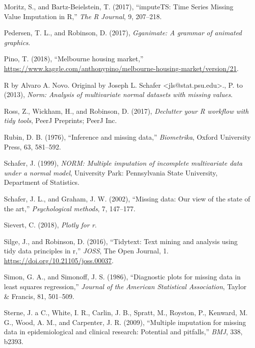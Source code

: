 \documentclass[]{article}
\theoremstyle{definition}
\theoremstyle{definition}
\theoremstyle{definition}
\theoremstyle{remark}
\begin{document}
\leavevmode\hypertarget{ref-imputeTS}{}%
Moritz, S., and Bartz-Beielstein, T. (2017), ``imputeTS: Time Series
Missing Value Imputation in R,'' \emph{The R Journal}, 9, 207--218.

\leavevmode\hypertarget{ref-gganimate}{}%
Pedersen, T. L., and Robinson, D. (2017), \emph{Gganimate: A grammar of
animated graphics}.

\leavevmode\hypertarget{ref-kaggle2018}{}%
Pino, T. (2018), ``Melbourne housing market,''
\url{https://www.kaggle.com/anthonypino/melbourne-housing-market/version/21}.

\leavevmode\hypertarget{ref-norm}{}%
R by Alvaro A. Novo. Original by Joseph L. Schafer
\textless{}jls@stat.psu.edu\textgreater{}., P. to (2013), \emph{Norm:
Analysis of multivariate normal datasets with missing values}.

\leavevmode\hypertarget{ref-Ross2017}{}%
Ross, Z., Wickham, H., and Robinson, D. (2017), \emph{Declutter your R
workflow with tidy tools}, PeerJ Preprints; PeerJ Inc.

\leavevmode\hypertarget{ref-Rubin1976}{}%
Rubin, D. B. (1976), ``Inference and missing data,'' \emph{Biometrika},
Oxford University Press, 63, 581--592.

\leavevmode\hypertarget{ref-schafer-norm}{}%
Schafer, J. (1999), \emph{NORM: Multiple imputation of incomplete
multivariate data under a normal model}, University Park: Pennsylvania
State University, Department of Statistics.

\leavevmode\hypertarget{ref-Schafer2002}{}%
Schafer, J. L., and Graham, J. W. (2002), ``Missing data: Our view of
the state of the art,'' \emph{Psychological methods}, 7, 147--177.

\leavevmode\hypertarget{ref-plotly}{}%
Sievert, C. (2018), \emph{Plotly for r}.

\leavevmode\hypertarget{ref-tidytext}{}%
Silge, J., and Robinson, D. (2016), ``Tidytext: Text mining and analysis
using tidy data principles in r,'' \emph{JOSS}, The Open Journal, 1.
\url{https://doi.org/10.21105/joss.00037}.

\leavevmode\hypertarget{ref-Simon1986}{}%
Simon, G. A., and Simonoff, J. S. (1986), ``Diagnostic plots for missing
data in least squares regression,'' \emph{Journal of the American
Statistical Association}, Taylor \& Francis, 81, 501--509.

\leavevmode\hypertarget{ref-Sterne2009}{}%
Sterne, J. a C., White, I. R., Carlin, J. B., Spratt, M., Royston, P.,
Kenward, M. G., Wood, A. M., and Carpenter, J. R. (2009), ``Multiple
imputation for missing data in epidemiological and clinical research:
Potential and pitfalls,'' \emph{BMJ}, 338, b2393.
\end{document}

